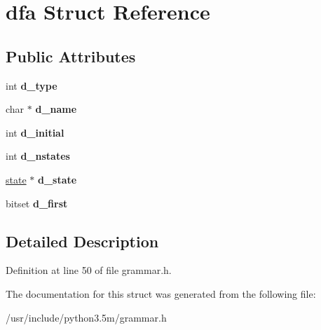 \hypertarget{structdfa}{}\section{dfa Struct Reference}
\label{structdfa}
\subsection*{Public Attributes}
\begin{DoxyCompactItemize}
\item 
int {\bfseries d\+\_\+type}\hypertarget{structdfa_a69ef1e4934ea32fd079f99bcd8018946}{}\label{structdfa_a69ef1e4934ea32fd079f99bcd8018946}

\item 
char $\ast$ {\bfseries d\+\_\+name}\hypertarget{structdfa_a714ab213ebbb5228584fe7593399e038}{}\label{structdfa_a714ab213ebbb5228584fe7593399e038}

\item 
int {\bfseries d\+\_\+initial}\hypertarget{structdfa_a5e8fc3fd1cb02df885c177bd234c9475}{}\label{structdfa_a5e8fc3fd1cb02df885c177bd234c9475}

\item 
int {\bfseries d\+\_\+nstates}\hypertarget{structdfa_ab53253e48bbb638e9bb9cb9ca744004b}{}\label{structdfa_ab53253e48bbb638e9bb9cb9ca744004b}

\item 
\hyperlink{structstate}{state} $\ast$ {\bfseries d\+\_\+state}\hypertarget{structdfa_aa70e502038acab62cce1c115f71cba7b}{}\label{structdfa_aa70e502038acab62cce1c115f71cba7b}

\item 
bitset {\bfseries d\+\_\+first}\hypertarget{structdfa_ad650d40c7f33bf9556eda163df616d20}{}\label{structdfa_ad650d40c7f33bf9556eda163df616d20}

\end{DoxyCompactItemize}


\subsection{Detailed Description}


Definition at line 50 of file grammar.\+h.



The documentation for this struct was generated from the following file\+:\begin{DoxyCompactItemize}
\item 
/usr/include/python3.\+5m/grammar.\+h\end{DoxyCompactItemize}
